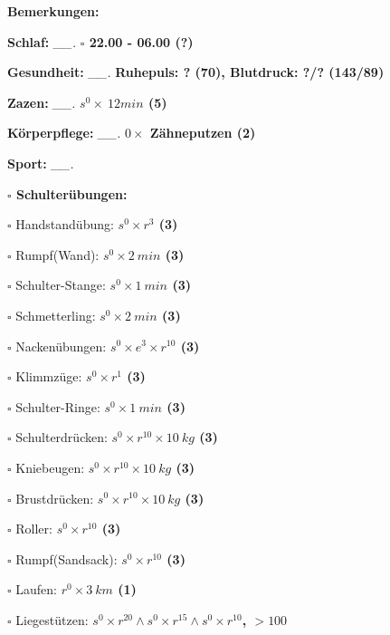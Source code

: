 \documentclass[10pt,a4paper]{article}
\newcommand\prop[1] {{\color {alizarin} {\bf #1}}}        %
\newcommand\mand[1] {{\color {burntorange} {\bf #1}}}     %
\newcommand\topspace{\vskip -15pt \hskip 20pt}
\newcommand\n[1] { {\sl #1.} \hskip 5pt }
\begin{document}
\begin{mdframed}[style=daystyle]
  \begin{labeling}{{\mand {Bemerkungen:}}}
    \setlength\itemsep{-3pt}
  \item[{\mand {Schlaf:}}]       \n{\_\_} {\prop {$\square$ 22.00 - 06.00 (?)}}
  \item[{\mand {Gesundheit:}}]   \n{\_\_} {\prop {Ruhepuls: ? (70), Blutdruck: ?/? (143/89)}}
  \item[{\mand {Zazen:}}]        \n{\_\_} {\prop {$s^0 \times\ 12 min$ (5)}}
  \item[{\mand {Körperpflege:}}] \n{\_\_} {\prop {$0 \times$ Zähneputzen (2)}}
  \item[{\mand {Sport:}}]        \n{\_\_}
    \topspace
    \begin{minipage}{0.75\textwidth}  
      \begin{labeling}{\prop {$\square$ {Schulterübungen:}}} 
        \setlength\itemsep{-3pt}
      \item[$\square$ Handstandübung:]  {\prop {$s^0 \times r^{3}$ (3)}}
      \item[$\square$ Rumpf(Wand):]     {\prop {$s^0 \times 2\ min$ (3)}}
      \item[$\square$ Schulter-Stange:] {\prop {$s^0 \times 1\ min$ (3)}}
      \item[$\square$ Schmetterling:]   {\prop {$s^0 \times 2\ min$ (3)}}
      \item[$\square$ Nackenübungen:]   {\prop {$s^0 \times e^3 \times r^{10}$ (3)}}
      \item[$\square$ Klimmzüge:]       {\prop {$s^0 \times r^1$ (3)}}
      \item[$\square$ Schulter-Ringe:]  {\prop {$s^0 \times 1\ min$ (3)}}
      \item[$\square$ Schulterdrücken:] {\prop {$s^0 \times r^{10} \times 10\ kg$ (3)}}
      \item[$\square$ Kniebeugen:]      {\prop {$s^0 \times r^{10} \times 10\ kg$ (3)}}
      \item[$\square$ Brustdrücken:]    {\prop {$s^0 \times r^{10} \times 10\ kg$ (3)}}
      \item[$\square$ Roller:]          {\prop {$s^0 \times r^{10}$ (3)}}
      \item[$\square$ Rumpf(Sandsack):] {\prop {$s^0 \times r^{10}$ (3)}}
      \item[$\square$ Laufen:]          {\prop {$r^0 \times 3\ km$ (1)}}
      \item[$\square$ Liegestützen:]    {\prop {$s^0 \times r^{20} \land s^0 \times r^{15} \land s^0 \times r^{10}$, $> 100$}}

\end{labeling}
\end{minipage}
\end{labeling}
\end{mdframed}
\end{document}
